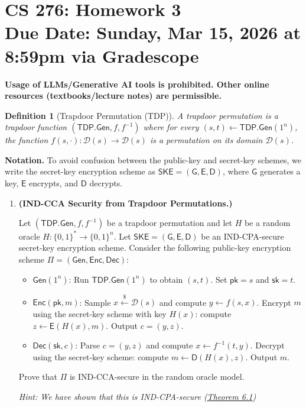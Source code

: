 \documentclass[11pt]{article}
\newtheorem{definition}[theorem]{Definition}
\numberwithin{equation}{section}
\newcommand{\duedate}{Sunday, Mar 15, 2026 at 8:59pm via Gradescope}
\begin{document}
\section*{CS 276: Homework 3\\ {\small Due Date: \duedate} }
\textbf{Usage of LLMs/Generative AI tools is prohibited. Other online resources (textbooks/lecture notes) are permissible.}

\begin{definition}[Trapdoor Permutation (TDP)]
A \emph{trapdoor permutation} is a trapdoor function $(\mathsf{TDP.Gen}, f, f^{-1})$ where for every $(s, t) \leftarrow \mathsf{TDP.Gen}(1^n)$, the function $f(s, \cdot) : \mathcal{D}(s) \to \mathcal{D}(s)$ is a \emph{permutation} on its domain $\mathcal{D}(s)$.
\end{definition}

\medskip
\noindent\textbf{Notation.} To avoid confusion between the public-key and secret-key schemes, we write the secret-key encryption scheme as $\mathsf{SKE} = (\mathsf{G}, \mathsf{E}, \mathsf{D})$, where $\mathsf{G}$ generates a key, $\mathsf{E}$ encrypts, and $\mathsf{D}$ decrypts. 

\begin{enumerate}
    \item \textbf{(IND-CCA Security from Trapdoor Permutations.)}

    Let $(\mathsf{TDP.Gen}, f, f^{-1})$ be a trapdoor permutation and let $H$ be a random oracle $H : \{0,1\}^* \to \{0,1\}^n$. Let $\mathsf{SKE} = (\mathsf{G}, \mathsf{E}, \mathsf{D})$ be an IND-CPA-secure secret-key encryption scheme. Consider the following public-key encryption scheme $\Pi = (\mathsf{Gen}, \mathsf{Enc}, \mathsf{Dec})$:

    \begin{itemize}
        \item $\mathsf{Gen}(1^n)$: Run $\mathsf{TDP.Gen}(1^n)$ to obtain $(s, t)$. Set $\mathsf{pk} = s$ and $\mathsf{sk} = t$.
        \item $\mathsf{Enc}(\mathsf{pk}, m)$: Sample $x \xleftarrow{\$} \mathcal{D}(s)$ and compute $y \leftarrow f(s, x)$. Encrypt $m$ using the secret-key scheme with key $H(x)$: compute $z \leftarrow \mathsf{E}(H(x), m)$. Output $c = (y, z)$.
        \item $\mathsf{Dec}(\mathsf{sk}, c)$: Parse $c = (y, z)$ and compute $x \leftarrow f^{-1}(t, y)$. Decrypt using the secret-key scheme: compute $m \leftarrow \mathsf{D}(H(x), z)$. Output $m$.
    \end{itemize}

    Prove that $\Pi$ is IND-CCA-secure in the random oracle model.

    \textit{Hint: We have shown that this is IND-CPA-secure (\href{https://crypto-berkeley.github.io/cs276-spring26/assets/lecture-notes/notes.pdf}{Theorem 6.1})}

\end{enumerate}
\end{document}
